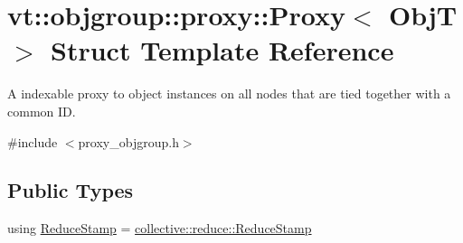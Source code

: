 \hypertarget{structvt_1_1objgroup_1_1proxy_1_1_proxy}{}\section{vt\+:\+:objgroup\+:\+:proxy\+:\+:Proxy$<$ ObjT $>$ Struct Template Reference}
\label{structvt_1_1objgroup_1_1proxy_1_1_proxy}


A indexable proxy to object instances on all nodes that are tied together with a common ID.  




{\ttfamily \#include $<$proxy\+\_\+objgroup.\+h$>$}

\subsection*{Public Types}
\begin{DoxyCompactItemize}
\item 
using \hyperlink{structvt_1_1objgroup_1_1proxy_1_1_proxy_a337be4c20cf11ff6477c7a66208cc909}{Reduce\+Stamp} = \hyperlink{namespacevt_1_1collective_1_1reduce_a7b7cb3021ac5654d92825d9fab0250b2}{collective\+::reduce\+::\+Reduce\+Stamp}
\end{DoxyCompactItemize}
